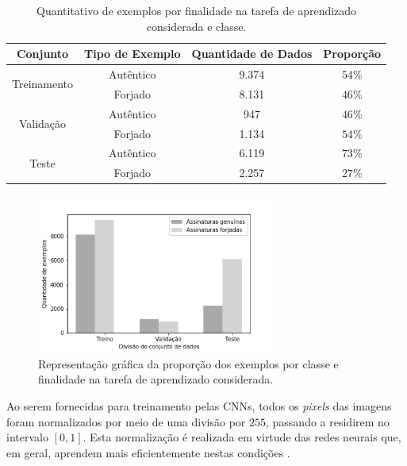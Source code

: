 \begin{table}[h!]
	\centering
	\caption{Quantitativo de exemplos por finalidade na tarefa de aprendizado considerada e classe.}
	\label{tab:divisao-dados}
	\begin{tabular}{c c c c}
		\toprule
		\textbf{Conjunto} & \textbf{Tipo de Exemplo} & \textbf{Quantidade de Dados} & \textbf{Proporção}\\
		\midrule
		\multirow{2}{*}{Treinamento} & Autêntico & 9.374 & $54\%$ \\
    & Forjado & 8.131 & $46\%$\\
     \midrule
		 \multirow{2}{*}{Validação} & Autêntico & 947 & $46\%$ \\
     & Forjado & 1.134 & $54\%$\\
		 \midrule
		 \multirow{2}{*}{Teste} & Autêntico & 6.119 & $73\%$ \\
     & Forjado & 2.257 & $27\%$\\
		\bottomrule
	\end{tabular}
\end{table}

\begin{figure}[h!]
\centering
\caption{Representação gráfica da proporção dos exemplos por classe e finalidade na tarefa de aprendizado considerada.}
\label{fig:divisao-dados}
\includegraphics[width=0.7\textwidth]{imgs/divisao-dados}
\end{figure}

Ao serem fornecidas para treinamento pelas CNNs, todos os \emph{pixels} das imagens foram normalizados por meio de uma divisão por $255$, passando a residirem no intervalo $[0,1]$. Esta normalização é realizada em virtude das redes neurais que, em geral, aprendem mais eficientemente nestas condições \cite{chollet}.

